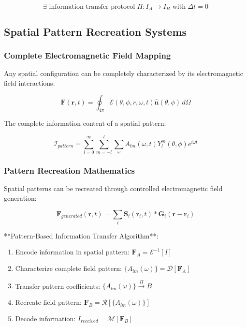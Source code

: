 \documentclass[12pt,a4paper]{article}
\theoremstyle{remark}
\begin{document}
\begin{equation}
\exists \text{ information transfer protocol } \Pi: I_A \rightarrow I_B \text{ with } \Delta t = 0
\end{equation}

\subsection{Spatial Pattern Recreation Systems}

\subsubsection{Complete Electromagnetic Field Mapping}

Any spatial configuration can be completely characterized by its electromagnetic field interactions:

\begin{equation}
\mathbf{F}(\mathbf{r}, t) = \oint_{4\pi} \mathcal{E}(\theta, \phi, r, \omega, t) \hat{\mathbf{n}}(\theta, \phi) \, d\Omega
\end{equation}

The complete information content of a spatial pattern:

\begin{equation}
\mathcal{I}_{pattern} = \sum_{l=0}^{\infty} \sum_{m=-l}^{l} \sum_{\omega} A_{lm}(\omega, t) Y_l^m(\theta, \phi) e^{i\omega t}
\end{equation}

\subsubsection{Pattern Recreation Mathematics}

Spatial patterns can be recreated through controlled electromagnetic field generation:

\begin{equation}
\mathbf{F}_{generated}(\mathbf{r}, t) = \sum_i \mathbf{S}_i(\mathbf{r}_i, t) \ast \mathbf{G}_i(\mathbf{r} - \mathbf{r}_i)
\end{equation}

**Pattern-Based Information Transfer Algorithm**:
\begin{enumerate}
\item Encode information in spatial pattern: $\mathbf{F}_A = \mathcal{E}^{-1}[I]$
\item Characterize complete field pattern: $\{A_{lm}(\omega)\} = \mathcal{D}[\mathbf{F}_A]$
\item Transfer pattern coefficients: $\{A_{lm}(\omega)\} \xrightarrow{\Pi} B$
\item Recreate field pattern: $\mathbf{F}_B = \mathcal{R}[\{A_{lm}(\omega)\}]$
\item Decode information: $I_{received} = \mathcal{M}[\mathbf{F}_B]$
\end{enumerate}
\end{document}
